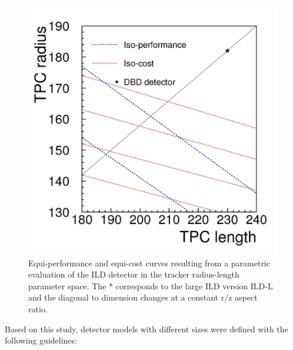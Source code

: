 \begin{figure}[t!]
\centering
\includegraphics[width=0.6\hsize]{ILD/fig/aspect_ratio.jpg}
\caption{Equi-performance and equi-cost curves resulting from a parametric evaluation of the ILD detector in the tracker radius-length parameter space. The * corresponds to the large ILD version ILD-L and the diagonal to dimension changes at a constant r/z aspect ratio.}
\label{fig:ILD:aspect_ratio}
\end{figure}

Based on this study, detector models with different sizes were defined with the following guidelines:

